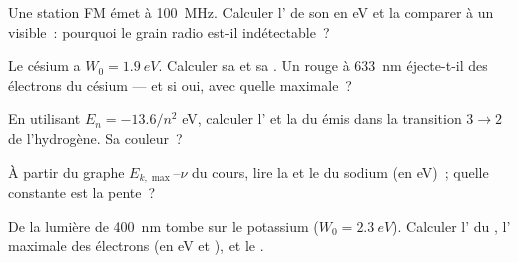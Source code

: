 \begin{exercise}[$\star$]\label{exo:g12:quantum-world:2}
Une station FM émet à \qty{100}{MHz}. Calculer l'
de son  en \unit{eV} et la comparer à un
 visible~: pourquoi le grain radio est-il
indétectable~?
\end{exercise}

\begin{exercise}[$\star$]\label{exo:g12:quantum-world:3}
Le césium a $W_0 = \qty{1.9}{eV}$. Calculer sa
 et sa
. Un
 rouge à \qty{633}{nm} éjecte-t-il des
électrons du césium --- et si oui, avec quelle
 maximale~?
\end{exercise}

\begin{exercise}[$\star$]\label{exo:g12:quantum-world:4}
En utilisant $E_n = -13.6/n^2$ \unit{eV}, calculer
l' et la
 du
 émis dans la transition $3 \to 2$ de
l'hydrogène. Sa couleur~?
\end{exercise}

\begin{exercise}[$\star$]\label{exo:g12:quantum-world:5}
À partir du graphe $E_{k,\max}$--$\nu$ du cours, lire la
 et le
 du sodium (en
\unit{eV})~; quelle constante est la pente~?
\end{exercise}

\begin{exercise}[$\star\star$]\label{exo:g12:quantum-world:6}
De la lumière de  \qty{400}{nm}
tombe sur le potassium ($W_0 = \qty{2.3}{eV}$). Calculer
l' du ,
l' maximale des électrons (en
\unit{eV} et ), et le
.
\end{exercise}

